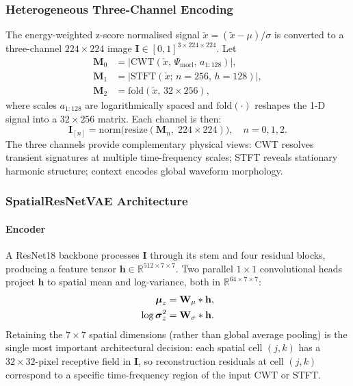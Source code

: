 \documentclass[preprint,12pt,3p]{elsarticle}
\newcommand{\R}{\mathbb{R}}
\newcommand{\bI}{\mathbf{I}}
\newcommand{\bmu}{\boldsymbol{\mu}}
\begin{document}
\subsubsection{Heterogeneous Three-Channel Encoding}
\label{sec:3ch}

The energy-weighted z-score normalised signal
$\check{x} = (\tilde{x} - \mu) / \sigma$
is converted to a three-channel $224{\times}224$ image
$\bI \in [0,1]^{3 \times 224 \times 224}$.
Let
%
\begin{align}
  \mathbf{M}_0 &= \bigl|\mathrm{CWT}(\check{x},\,
                  \Psi_\mathrm{morl},\,a_{1:128})\bigr|,
                  \label{eq:cwt_ch} \\
  \mathbf{M}_1 &= \bigl|\mathrm{STFT}(\check{x};\,
                  n{=}256,\,h{=}128)\bigr|,
                  \label{eq:stft_ch} \\
  \mathbf{M}_2 &= \mathrm{fold}(\check{x},\,32{\times}256),
                  \label{eq:context_ch}
\end{align}
%
where scales $a_{1:128}$ are logarithmically spaced and
$\mathrm{fold}(\cdot)$ reshapes the 1-D signal into a $32{\times}256$
matrix.
Each channel is then:
%
\begin{equation}
  \bI_{[n]} = \mathrm{norm}\!\bigl(
    \mathrm{resize}(\mathbf{M}_n,\;224{\times}224)
  \bigr), \quad n=0,1,2.
  \label{eq:img_ch}
\end{equation}
The three channels provide complementary physical views: CWT resolves
transient signatures at multiple time-frequency scales; STFT reveals
stationary harmonic structure; context encodes global waveform
morphology.

\subsubsection{SpatialResNetVAE Architecture}
\label{sec:vae_arch}

\paragraph{Encoder}
A ResNet18 backbone processes $\bI$ through its stem and four residual
blocks, producing a feature tensor $\mathbf{h} \in \R^{512 \times 7 \times 7}$.
Two parallel $1{\times}1$ convolutional heads project $\mathbf{h}$ to
spatial mean and log-variance, both in $\R^{64 \times 7 \times 7}$:
%
\begin{align}
  \bmu_z &= \mathbf{W}_\mu * \mathbf{h}, \notag \\
  \log\boldsymbol{\sigma}_z^2 &= \mathbf{W}_\sigma * \mathbf{h}.
  \label{eq:spatial_proj}
\end{align}
%
Retaining the $7{\times}7$ spatial dimensions (rather than global
average pooling) is the single most important architectural decision:
each spatial cell $(j,k)$ has a $32{\times}32$-pixel receptive field
in $\bI$, so reconstruction residuals at cell $(j,k)$ correspond to
a specific time-frequency region of the input CWT or STFT.
\end{document}
